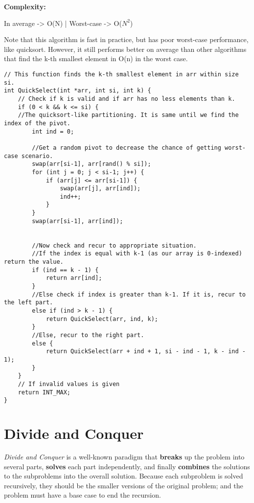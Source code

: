 \documentclass[12pt]{article}
\begin{document}
\textbf{Complexity: }

	In average -> O(N)  |  Worst-case -> O($N^{2}$)

    Note that this algorithm is fast in practice, but has poor worst-case performance, like quicksort. However, it still performs better on average than other algorithms that find the k-th smallest element in O(n) in the worst case.


\begin{verbatim}
// This function finds the k-th smallest element in arr within size si.
int QuickSelect(int *arr, int si, int k) {
    // Check if k is valid and if arr has no less elements than k.
    if (0 < k && k <= si) {
    //The quicksort-like partitioning. It is same until we find the index of the pivot.
        int ind = 0;
        
        //Get a random pivot to decrease the chance of getting worst-case scenario.
        swap(arr[si-1], arr[rand() % si]);
        for (int j = 0; j < si-1; j++) {
            if (arr[j] <= arr[si-1]) {
                swap(arr[j], arr[ind]);
                ind++;
            }
        }
        swap(arr[si-1], arr[ind]);
        
        
        //Now check and recur to appropriate situation.
        //If the index is equal with k-1 (as our array is 0-indexed) return the value.
        if (ind == k - 1) {
            return arr[ind];
        }
        //Else check if index is greater than k-1. If it is, recur to the left part.
        else if (ind > k - 1) {
            return QuickSelect(arr, ind, k);
        }
        //Else, recur to the right part.
        else {
            return QuickSelect(arr + ind + 1, si - ind - 1, k - ind - 1);
        }
    }
    // If invalid values is given
    return INT_MAX;  
}
\end{verbatim}

\cleardoublepage

	\section{Divide and Conquer}

\textit{Divide and Conquer} is a well-known paradigm that \textbf{breaks} up the problem into several parts, \textbf{solves} each part independently, and finally \textbf{combines} the solutions to the subproblems into the overall solution. Because each subproblem is solved recursively, they should be the smaller versions of the original problem; and the problem must have a base case to end the recursion. 
\end{document}
